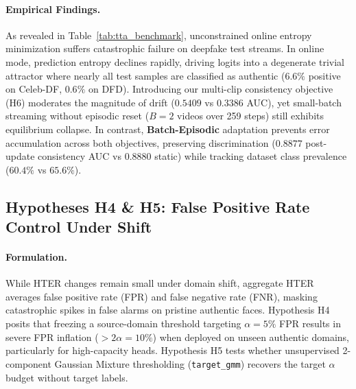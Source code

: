 \paragraph{Empirical Findings.}
As revealed in Table~\ref{tab:tta_benchmark}, unconstrained online entropy minimization suffers catastrophic failure on deepfake test streams. In online mode, prediction entropy declines rapidly, driving logits into a degenerate trivial attractor where nearly all test samples are classified as authentic ($6.6\%$ positive on Celeb-DF, $0.6\%$ on DFD). Introducing our multi-clip consistency objective (H6) moderates the magnitude of drift ($0.5409$ vs $0.3386$ AUC), yet small-batch streaming without episodic reset ($B=2$ videos over 259 steps) still exhibits equilibrium collapse. In contrast, \textbf{Batch-Episodic} adaptation prevents error accumulation across both objectives, preserving discrimination ($0.8877$ post-update consistency AUC vs $0.8880$ static) while tracking dataset class prevalence ($60.4\%$ vs $65.6\%$).

\subsection{Hypotheses H4 \& H5: False Positive Rate Control Under Shift}
\label{sec:fpr_control}
\paragraph{Formulation.}
While HTER changes remain small under domain shift, aggregate HTER averages false positive rate (FPR) and false negative rate (FNR), masking catastrophic spikes in false alarms on pristine authentic faces. Hypothesis H4 posits that freezing a source-domain threshold targeting $\alpha = 5\%$ FPR results in severe FPR inflation ($> 2\alpha = 10\%$) when deployed on unseen authentic domains, particularly for high-capacity heads. Hypothesis H5 tests whether unsupervised 2-component Gaussian Mixture thresholding (\texttt{target\_gmm}) recovers the target $\alpha$ budget without target labels.

